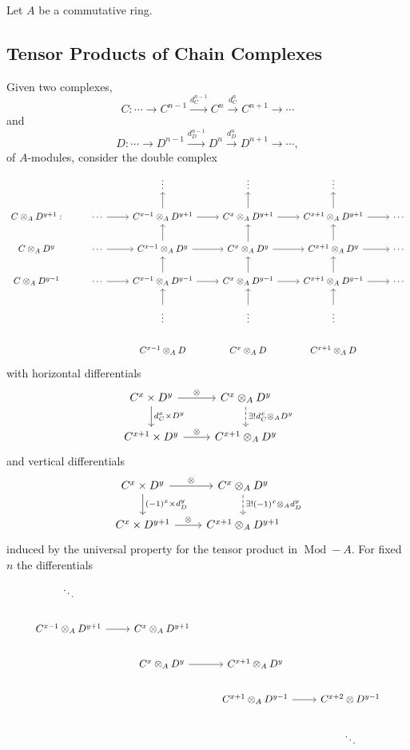 \documentclass[dissertation.tex]{subfiles}
\begin{document}
Let $A$ be a commutative ring.

\subsection{Tensor Products of Chain Complexes}
Given two complexes, 
$$C : \cdots \to C^{n-1} \overset{d^{n-1}_C}\to C^n \overset{d^n_C}\to C^{n+1} \to \cdots$$
and 
$$D : \cdots \to D^{n-1} \overset{d^{n-1}_D}\to D^n \overset{d^n_D}\to D^{n+1} \to \cdots,$$
of $A$-modules,
consider the double complex
$$\begin{tikzcd}
  & & \vdots & \vdots & \vdots & \\
  C \otimes_A D^{y + 1}: & \cdots \arrow{r}& C^{x - 1} \otimes_A D^{y + 1}\arrow{u}\arrow{r} & C^x \otimes_A D^{y + 1}\arrow{u}\arrow{r} & C^{x + 1} \otimes_A D^{y + 1}\arrow{u}\arrow{r} & \cdots\\
  C \otimes_A D^{y} & \cdots \arrow{r} & C^{x - 1} \otimes_A D^{y}\arrow{u}\arrow{r} & C^x \otimes_A D^{y}\arrow{u}\arrow{r} & C^{x + 1} \otimes_A D^{y}\arrow{u}\arrow{r} & \cdots\\
  C \otimes_A D^{y - 1} & \cdots \arrow{r} & C^{x - 1} \otimes_A D^{y - 1}\arrow{u}\arrow{r} & C^x \otimes_A D^{y - 1}\arrow{u}\arrow{r} & C^{x + 1} \otimes_A D^{y - 1}\arrow{u}\arrow{r} & \cdots\\
  & & \vdots\arrow{u} & \vdots\arrow{u} & \vdots\arrow{u} & \\
  & & C^{x-1} \otimes_A D & C^x \otimes_A D & C^{x + 1} \otimes_A D
\end{tikzcd}$$
with horizontal differentials
$$\begin{tikzcd}
  C^x \times D^y \arrow{r}{\otimes}\arrow{d}{d^x_C \times D^y} & C^x \otimes_A D^y \arrow[dashed]{d}{\exists ! d^x_C \otimes_A D^y}\\
  C^{x + 1} \times D^y \arrow{r}{\otimes} & C^{x + 1}\otimes_A D^y
\end{tikzcd}$$
and vertical differentials
$$\begin{tikzcd}
  C^x \times D^y \arrow{r}{\otimes}\arrow{d}{(-1)^x \times d_D^y} & C^x \otimes_A D^y \arrow[dashed]{d}{\exists ! (-1)^x \otimes_A d_D^y}\\
  C^{x} \times D^{y+1} \arrow{r}{\otimes} & C^{x + 1}\otimes_A D^{y + 1}
\end{tikzcd}$$
induced by the universal property for the tensor product in $\operatorname{Mod}-{A}$.
For fixed $n$ the differentials
$$\begin{tikzcd}
  & \ddots\\
  & C^{x - 1} \otimes_A D^{y + 1} \arrow{r} & C^x \otimes_A D^{y + 1}\\
  & & C^x \otimes_A D^{y} \arrow{r} & C^{x + 1} \otimes_A D^{y}\\
  & & & C^{x + 1} \otimes_A D^{y - 1} \arrow{r} & C^{x + 2} \otimes D^{y - 1}\\
  & & & & \ddots &
\end{tikzcd}$$
\end{document}
